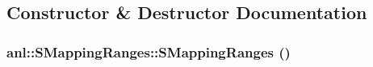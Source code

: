 \subsection{Constructor \& Destructor Documentation}
\hypertarget{structanl_1_1SMappingRanges_aa0a5d875502335622a10f75129ae2450}{
\subsubsection[{SMappingRanges}]{\setlength{\rightskip}{0pt plus 5cm}anl::SMappingRanges::SMappingRanges ()}}
\label{structanl_1_1SMappingRanges_aa0a5d875502335622a10f75129ae2450}


